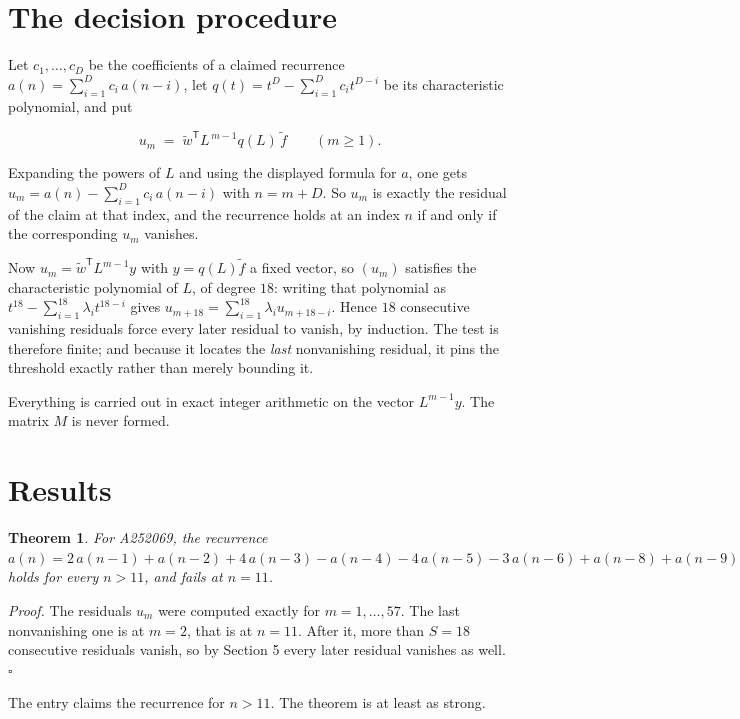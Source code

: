 \documentclass[11pt]{article}
\newtheorem{theorem}{Theorem}
\theoremstyle{definition}
\begin{document}
\section{The decision procedure}

Let $c_1,\dots,c_D$ be the coefficients of a claimed recurrence $a(n) = \sum_{i=1}^{D} c_i\,a(n-i)$, let $q(t) = t^{D} - \sum_{i=1}^{D} c_i t^{D-i}$ be its characteristic polynomial, and put

\[u_m \;=\; \tilde w^{\mathsf T} L^{\,m-1} q(L)\,\tilde f \qquad (m \ge 1).\]

Expanding the powers of $L$ and using the displayed formula for $a$, one gets $u_m = a(n) - \sum_{i=1}^{D} c_i\,a(n-i)$ with $n = m + D$. So $u_m$ is exactly the residual of the claim at that index, and the recurrence holds at an index $n$ if and only if the corresponding $u_m$ vanishes.

Now $u_m = \tilde w^{\mathsf T} L^{m-1} y$ with $y = q(L)\tilde f$ a fixed vector, so $(u_m)$ satisfies the characteristic polynomial of $L$, of degree $18$: writing that polynomial as $t^{18} - \sum_{i=1}^{18} \lambda_i t^{18-i}$ gives $u_{m+18} = \sum_{i=1}^{18} \lambda_i u_{m+18-i}$. Hence $18$ consecutive vanishing residuals force every later residual to vanish, by induction. The test is therefore finite; and because it locates the {\itshape last} nonvanishing residual, it pins the threshold exactly rather than merely bounding it.

Everything is carried out in exact integer arithmetic on the vector $L^{m-1}y$. The matrix $M$ is never formed.

\section{Results}

\begin{theorem} For A252069, the recurrence $a(n) = 2\,a(n-1) + a(n-2) + 4\,a(n-3) - a(n-4) - 4\,a(n-5) - 3\,a(n-6) + a(n-8) + a(n-9)$ holds for every $n > 11$, and fails at $n = 11$.\end{theorem}

{\itshape Proof.} The residuals $u_m$ were computed exactly for $m = 1,\dots,57$. The last nonvanishing one is at $m = 2$, that is at $n = 11$. After it, more than $S = 18$ consecutive residuals vanish, so by Section 5 every later residual vanishes as well. $\square$

The entry claims the recurrence for $n > 11$. The theorem is at least as strong.
\end{document}
